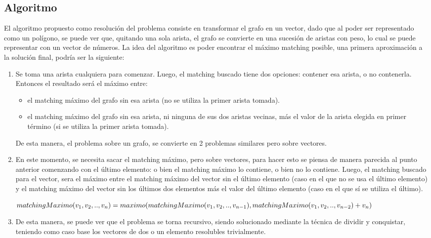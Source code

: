 \documentclass[a4paper, 12pt]{article}
\begin{document}

\subsection*{Algoritmo}



El algoritmo propuesto como resolución del problema consiste en transformar el grafo en un vector, dado que al poder ser representado como un polígono, se puede ver que, quitando una sola arista, el grafo se convierte en una sucesión de aristas con peso, lo cual se puede representar con un vector de números. La idea del algoritmo es poder encontrar el máximo matching posible, una primera aproximación a la solución final, podría ser la siguiente:

\begin{enumerate}
\item Se toma una arista cualquiera para comenzar. Luego, el matching buscado tiene dos opciones: contener esa arista, o no contenerla. Entonces el resultado será el máximo entre:
\begin{itemize}
 \item el matching máximo del grafo sin esa arista (no se utiliza la primer arista tomada).
 \item el matching máximo del grafo sin esa arista, ni ninguna de sus dos aristas vecinas, más el valor de la arista elegida en primer término (si se utiliza la primer arista tomada).
\end{itemize}
  De esta manera, el problema sobre un grafo, se convierte en 2 problemas similares pero sobre vectores.
\item En este momento, se necesita sacar el matching máximo, pero sobre vectores, para hacer esto se piensa de manera parecida al punto anterior comenzando con el último elemento: o bien el matching máximo lo contiene, o bien no lo contiene. Luego, el matching buscado para el vector, sera el máximo entre el matching máximo del vector sin el último elemento (caso en el que no se usa el último elemento) y el matching máximo del vector sin los últimos dos elementos más el valor del último elemento (caso en el que sí se utiliza el último).

	$matchingMaximo(v_1,v_2,..,v_n) = \\ maximo(matchingMaximo(v_1,v_2,..,v_{n-1}), \\ matchingMaximo(v_1,v_2,..,v_{n-2}) + v_n)$
\item De esta manera, se puede ver que el problema se torna recursivo, siendo solucionado mediante la técnica de dividir y conquistar, teniendo como caso base los vectores de dos o un elemento resolubles trivialmente.
\end{enumerate}
\end{document}
